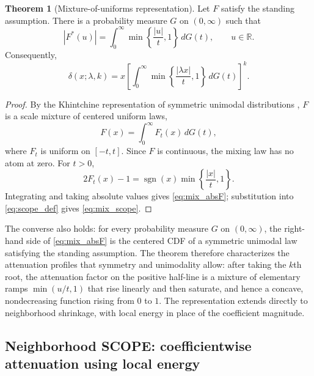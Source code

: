 \documentclass[12pt]{article}
\theoremstyle{definition}
\newtheorem{theorem}{Theorem}
\theoremstyle{definition}
\DeclareMathOperator{\sgn}{sgn}
\newcommand{\R}{\mathbb{R}}
\begin{document}
\begin{theorem}[Mixture-of-uniforms representation]
Let $F$ satisfy the standing assumption. There is a probability measure
$G$ on $(0,\infty)$ such that
\begin{equation}
|F^*(u)|=\int_0^\infty
\min\!\left\{\frac{|u|}{t},1\right\}\,dG(t),
\qquad u\in\R.
\label{eq:mix_absF}
\end{equation}
Consequently,
\begin{equation}
\delta(x;\lambda,k)=x\left[
\int_0^\infty\min\!\left\{\frac{|\lambda x|}{t},1\right\}
\,dG(t)\right]^k.
\label{eq:mix_scope}
\end{equation}
\end{theorem}

\begin{proof}
By the Khintchine representation of symmetric unimodal distributions
\citep{Khintchine1938}, $F$ is a scale mixture of centered uniform
laws,
\begin{equation}
F(x)=\int_0^\infty F_t(x)\,dG(t),
\label{eq:mix_F}
\end{equation}
where $F_t$ is uniform on $[-t,t]$. Since $F$ is continuous, the mixing
law has no atom at zero. For $t>0$,
\begin{equation}
2F_t(x)-1=\sgn(x)\min\!\left\{\frac{|x|}{t},1\right\}.
\label{eq:uniform_centered}
\end{equation}
Integrating and taking absolute values gives \eqref{eq:mix_absF};
substitution into \eqref{eq:scope_def} gives \eqref{eq:mix_scope}.
\end{proof}

The converse also holds: for every probability measure $G$ on
$(0,\infty)$, the right-hand side of \eqref{eq:mix_absF} is the centered
CDF of a symmetric unimodal law satisfying the standing assumption. The
theorem therefore characterizes the attenuation profiles that symmetry
and unimodality allow: after taking the $k$th root, the attenuation
factor on the positive half-line is a mixture of elementary ramps
$\min(u/t,1)$ that rise linearly and then saturate, and hence a concave,
nondecreasing function rising from $0$ to $1$. The representation extends
directly to neighborhood shrinkage, with local energy in place of the
coefficient magnitude.

\subsection{Neighborhood SCOPE: coefficientwise attenuation using local energy}
\label{sec:nscope}
\end{document}
